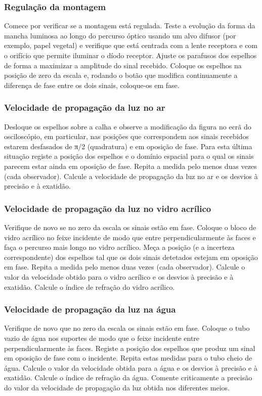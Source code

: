\documentclass[a4paper,12pt]{article}      %
\begin{document}
\subsubsection{\sf Regulação da montagem}
 
Comece por verificar se a montagem está regulada. Teste a evolução da forma da mancha 
luminosa ao longo do percurso óptico usando um alvo difusor (por exemplo, papel vegetal) e 
verifique que está centrada com a lente receptora e com o orifício que permite iluminar o 
díodo receptor. Ajuste os parafusos dos espelhos de forma a maximizar a amplitude do sinal 
recebido.
Coloque os espelhos na posição de zero da escala e, rodando o botão que modifica 
continuamente a diferença de fase entre os dois sinais, coloque-os em fase. 

\subsubsection{\sf Velocidade de propagação da luz no ar}
Desloque os espelhos sobre a calha e observe a modificação da figura no ecrã do 
osciloscópio, em particular, nas posições que correspondem aos sinais recebidos estarem 
desfasados de π/2 (quadratura) e em oposição de fase. Para esta última situação registe a 
posição dos espelhos e o domínio espacial para o qual os sinais parecem estar ainda em 
oposição de fase. Repita a medida pelo menos duas vezes (cada observador). 
Calcule a velocidade de propagação da luz no ar e os desvios à precisão e à exatidão. 

\subsubsection{\sf Velocidade de propagação da luz no vidro acrílico}
Verifique de novo se no zero da escala os sinais estão em fase. Coloque o bloco de vidro 
acrílico no feixe incidente de modo que entre perpendicularmente às faces e faça o percurso 
mais longo no vidro acrílico. Meça a posição (e a incerteza correspondente) dos espelhos tal 
que os dois sinais detetados estejam em oposição em fase. Repita a medida pelo menos 
duas vezes (cada observador).
Calcule o valor da velocidade obtido para o vidro acrílico e os desvios à precisão e à 
exatidão. Calcule o índice de refração do vidro acrílico.

\subsubsection{\sf Velocidade de propagação da luz na água}
Verifique de novo que no zero da escala os sinais estão em fase. Coloque o tubo vazio de 
água nos suportes de modo que o feixe incidente entre perpendicularmente às faces.
Registe a posição dos espelhos que produz um sinal em oposição de fase com o incidente. 
Repita estas medidas para o tubo cheio de água. 
Calcule o valor da velocidade obtida para a água e os desvios à precisão e à exatidão. 
Calcule o índice de refração da água. 
Comente criticamente a precisão do valor da velocidade de propagação da luz obtida nos 
diferentes meios.
\end{document}
